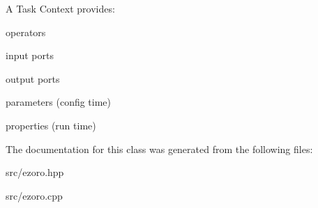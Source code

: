 A Task Context provides\-:
\begin{DoxyItemize}
\item operators
\item input ports
\item output ports
\item parameters (config time)
\item properties (run time) 
\end{DoxyItemize}

The documentation for this class was generated from the following files\-:\begin{DoxyCompactItemize}
\item 
src/ezoro.\-hpp\item 
src/ezoro.\-cpp\end{DoxyCompactItemize}
